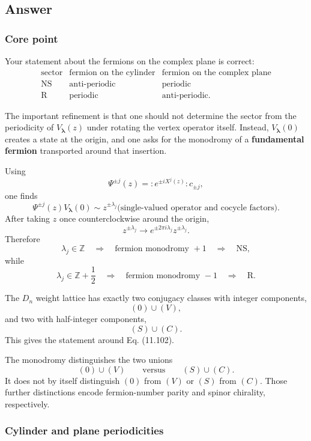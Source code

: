 \documentclass[
  10pt,
  a4paper,
  openany]{book}
\begin{document}
\subsection{Answer}\label{answer-19}

\subsubsection{Core point}\label{core-point-19}

Your statement about the fermions on the complex plane is correct: \[
\begin{array}{c|c|c}
\text{sector}
&\text{fermion on the cylinder}
&\text{fermion on the complex plane}\\
\hline
\mathrm{NS}&\text{anti-periodic}&\text{periodic}\\
\mathrm R&\text{periodic}&\text{anti-periodic}.
\end{array}
\]

The important refinement is that one should not determine the sector
from the periodicity of \(V_{\boldsymbol\lambda}(z)\) under rotating the
vertex operator itself. Instead, \(V_{\boldsymbol\lambda}(0)\) creates a
state at the origin, and one asks for the monodromy of a
\textbf{fundamental fermion} transported around that insertion.

Using \[
\Psi^{\pm j}(z)
=:\!e^{\pm iX^j(z)}\!:c_{\pm j},
\] one finds \[
\boxed{
\Psi^{\pm j}(z)V_{\boldsymbol\lambda}(0)
\sim
z^{\pm\lambda_j}
\bigl(\text{single-valued operator and cocycle factors}\bigr).
}
\] After taking \(z\) once counterclockwise around the origin, \[
z^{\pm\lambda_j}
\longrightarrow
e^{\pm2\pi i\lambda_j}z^{\pm\lambda_j}.
\] Therefore \[
\lambda_j\in\mathbb Z
\quad\Longrightarrow\quad
\text{fermion monodromy }+1
\quad\Longrightarrow\quad
\mathrm{NS},
\] while \[
\lambda_j\in\mathbb Z+\frac12
\quad\Longrightarrow\quad
\text{fermion monodromy }-1
\quad\Longrightarrow\quad
\mathrm R.
\]

The \(D_n\) weight lattice has exactly two conjugacy classes with
integer components, \[
(0)\cup(V),
\] and two with half-integer components, \[
(S)\cup(C).
\] This gives the statement around Eq. (11.102).

The monodromy distinguishes the two unions \[
(0)\cup(V)
\qquad\text{versus}\qquad
(S)\cup(C).
\] It does not by itself distinguish \((0)\) from \((V)\) or \((S)\)
from \((C)\). Those further distinctions encode fermion-number parity
and spinor chirality, respectively.

\subsubsection{Cylinder and plane
periodicities}\label{cylinder-and-plane-periodicities}
\end{document}
